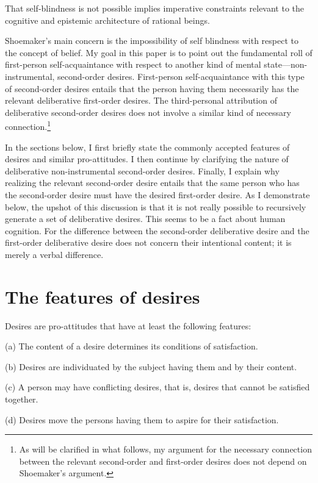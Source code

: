 \documentclass[output=paper,colorlinks,citecolor=brown
]{langscibook}
\begin{document}
That self-blindness is not possible implies imperative constraints relevant to the cognitive and epistemic architecture of rational beings.

Shoemaker’s main concern is the impossibility of self blindness with respect to the concept of belief. My goal in this paper is to point out the fundamental roll of first-person self-acquaintance with respect to another kind of mental state—non-instrumental, second-order desires. First-person self-acquaintance with this type of second-order desires entails that the person having them necessarily has the relevant deliberative first-order desires. The third-personal attribution of deliberative second-order desires does not involve a similar kind of necessary connection.\footnote{As will be clarified in what follows, my argument for the necessary connection between the relevant second-order and first-order desires does not depend on Shoemaker's argument.}
	
	In the sections below, I first briefly state the commonly accepted features of desires and similar pro-attitudes. I then continue by clarifying the nature of deliberative non-instrumental second-order desires. Finally, I explain why realizing the relevant second-order desire entails that the same person who has the second-order desire must have the desired first-order desire. As I demonstrate below, the upshot of this discussion is that it is not really possible to recursively generate a set of deliberative desires. This seems to be a fact about human cognition. For the difference between the second-order deliberative desire and the first-order deliberative desire does not concern their intentional content; it is merely a verbal difference.
	
	\section{The features of desires}
Desires are pro-attitudes that have at least the following features:

(a)	The content of a desire determines its conditions of satisfaction. 

(b)	Desires are individuated by the subject having them and by their content.

(c)	A person may have conflicting desires, that is, desires that cannot be satisfied together. 

(d)	Desires move the persons having them to aspire for their satisfaction.
\end{document}
